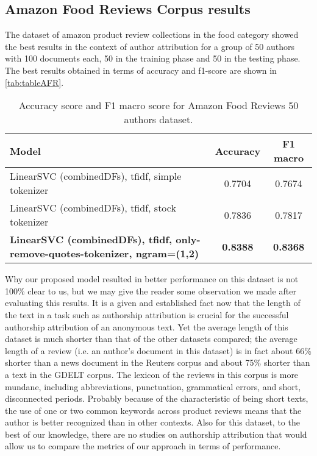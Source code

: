 \subsection{Amazon Food Reviews Corpus results}
The dataset of amazon product review collections in the food category showed the best results in the context of author attribution for a group of 50 authors with 100 documents each, 50 in the training phase and 50 in the testing phase. The best results obtained in terms of accuracy and f1-score are shown in \autoref{tab:tableAFR}.

\begin{table}[h!]
	\begin{center}  
		\caption[Amazon Food Reviews Results - 50 authors]{Accuracy score and F1 macro score for Amazon Food Reviews 50 authors dataset.} 
		\label{tab:tableAFR}
		\begin{tabular}{| p{5 cm} | c | c |}
			\hline 
			Model & Accuracy & F1 macro \\
			\hline
			LinearSVC (combinedDFs), tfidf, simple tokenizer & 0.7704 & 0.7674 \\ \hline
			LinearSVC (combinedDFs), tfidf, stock tokenizer & 0.7836 & 0.7817 \\ \hline
			\textbf{LinearSVC (combinedDFs), tfidf, only-remove-quotes-tokenizer,
				ngram=(1,2)} & \textbf{0.8388} & \textbf{0.8368} \\ \hline
		\end{tabular} 
	\end{center}
\end{table}

Why our proposed model resulted in better performance on this dataset is not 100\% clear to us, but we may give the reader some observation we made after evaluating this results. It is a given and established fact now that the length of the text in a task such as authorship attribution is crucial for the successful authorship attribution of an anonymous text. Yet the average length of this dataset is much shorter than that of the other datasets compared; the average length of a review (i.e. an author's document in this dataset) is in fact about 66\% shorter than a news document in the Reuters corpus and about 75\% shorter than a text in the GDELT corpus. The lexicon of the reviews in this corpus is more mundane, including abbreviations, punctuation, grammatical errors, and short, disconnected periods. Probably because of the characteristic of being short texts, the use of one or two common keywords across product reviews means that the author is better recognized than in other contexts.
Also for this dataset, to the best of our knowledge, there are no studies on authorship attribution that would allow us to compare the metrics of our approach in terms of performance.

